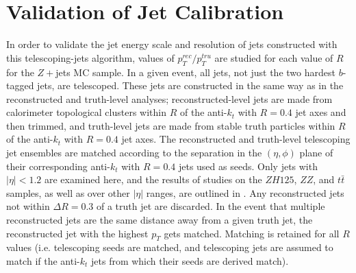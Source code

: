 \section{Validation of Jet Calibration}
\label{sec:val}
In order to validate the jet energy scale and resolution of jets constructed with this telescoping-jets algorithm, values of $p_T^{rec}/p_T^{tru}$ are studied for each value of $R$ for the $Z+$jets MC sample.  In a given event, all jets, not just the two hardest $b$-tagged jets, are telescoped.  These jets are constructed in the same way as in the reconstructed and truth-level analyses; reconstructed-level jets are made from calorimeter topological clusters within $R$ of the anti-$k_t$ with $R=0.4$ jet axes and then trimmed, and truth-level jets are made from stable truth particles within $R$ of the anti-$k_t$ with $R=0.4$ jet axes.  The reconstructed and truth-level telescoping jet ensembles are matched according to the separation in the $\left(\eta,\phi\right)$ plane of their corresponding anti-$k_t$ with $R=0.4$ jets used as seeds.  Only jets with $\left|\eta\right|<1.2$ are examined here, and the results of studies on the $ZH125$, $ZZ$, and $t\bar{t}$ samples, as well as over other $\left|\eta\right|$ ranges, are outlined in \cite{teljet}.  Any reconstructed jets not within $\Delta R=0.3$ of a truth jet are discarded.  In the event that multiple reconstructed jets are the same distance away from a given truth jet, the reconstructed jet with the highest $p_T$ gets matched.  Matching is retained for all $R$ values (i.e. telescoping seeds are matched, and telescoping jets are assumed to match if the anti-$k_t$ jets from which their seeds are derived match).

